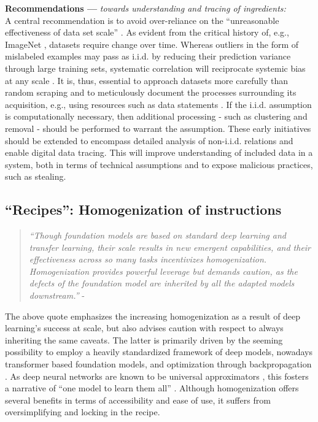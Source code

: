 \documentclass[manuscript,screen,authorversion,nonacm]{acmart}
\begin{document}
\noindent \textbf{Recommendations ---} \textit{towards understanding and tracing of ingredients:} \\
A central recommendation is to avoid over-reliance on the ``unreasonable effectiveness of data set scale'' \cite{Sun2017unreasonabledata}. As evident from the critical history of, e.g., ImageNet \cite{Denton2021GenealogyDatasets,Deng2009ImageNet},  datasets require change over time. Whereas outliers in the form of mislabeled examples may pass as i.i.d. by reducing their prediction variance through large training sets, systematic correlation will reciprocate systemic bias at any scale \cite{dundar2007learning}. It is, thus, essential to approach datasets more carefully than random scraping and to meticulously document the processes surrounding its acquisition, e.g., using resources such as data statements \cite{Bender2018DataStatements,Gebru2018Datasheets}.  
If the i.i.d. assumption is computationally necessary, then additional processing - such as clustering and removal - should be performed to warrant the assumption. These early initiatives should be extended to encompass detailed analysis of non-i.i.d. relations and enable digital data tracing. This will improve understanding of included data in a system, both in terms of technical assumptions and to expose malicious practices, such as stealing.

\subsection{``Recipes'': Homogenization of instructions } 

\begin{quote}
    \emph{``Though foundation models are based on standard deep learning and transfer learning, their scale results in new emergent capabilities, and their effectiveness across so many tasks incentivizes homogenization. Homogenization provides powerful leverage but demands caution, as the defects of the foundation model are inherited by all the adapted models downstream.''} - \citet{Bommasani2021FoundationModels}
\end{quote}

\noindent The above quote emphasizes the increasing homogenization as a result of deep learning's success at scale, but also advises caution with respect to always inheriting the same caveats. 
The latter is primarily driven by the seeming possibility to employ a heavily standardized framework of deep models, nowadays transformer \cite{Vaswani2017AttentionAllYouNeed} based foundation models, and optimization through backpropagation \cite{Werbos1982Backprop,Rumelhart1986Backprop,LeCun2012EffBackprop}. As deep neural networks are known to be universal approximators \cite{HORNIK1989359}, this fosters a narrative of ``one model to learn them all'' \cite{Kaiser2017ModelLearnAll,Reed2022Gato}. Although homogenization offers several benefits in terms of accessibility and ease of use, it suffers from oversimplifying and locking in the recipe. 
\end{document}
